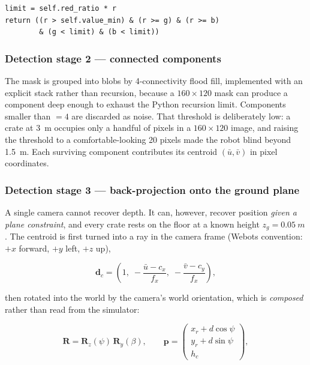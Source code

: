 \begin{lstlisting}[style=python]
limit = self.red_ratio * r
return ((r > self.value_min) & (r >= g) & (r >= b)
        & (g < limit) & (b < limit))
\end{lstlisting}

\subsubsection{Detection stage 2 --- connected components}

The mask is grouped into blobs by 4-connectivity flood fill, implemented
with an explicit stack rather than recursion, because a $160 \times 120$
mask can produce a component deep enough to exhaust the Python recursion
limit. Components smaller than  $= 4$ are
discarded as noise. That threshold is deliberately low: a crate at
\SI{3}{m} occupies only a handful of pixels in a $160 \times 120$ image,
and raising the threshold to a comfortable-looking 20 pixels made the
robot blind beyond \SI{1.5}{m}. Each surviving component contributes its
centroid $(\bar u, \bar v)$ in pixel coordinates.

\subsubsection{Detection stage 3 --- back-projection onto the ground plane}

A single camera cannot recover depth. It can, however, recover position
\emph{given a plane constraint}, and every crate rests on the floor at a
known height $z_g = \SI{0.05}{m}$. The centroid is first turned into a
ray in the camera frame (Webots convention: $+x$ forward, $+y$ left,
$+z$ up),

\begin{equation}
\mathbf{d}_c = \left(1,\; -\frac{\bar u - c_x}{f_x},\;
                         -\frac{\bar v - c_y}{f_x}\right),
\label{eq:ray}
\end{equation}

then rotated into the world by the camera's world orientation, which is
\emph{composed} rather than read from the simulator:

\begin{equation}
\mathbf{R} = \mathbf{R}_z(\psi)\,\mathbf{R}_y(\beta),
\qquad
\mathbf{p} = \begin{pmatrix}
  x_r + d\cos\psi\\[1pt] y_r + d\sin\psi\\[1pt] h_c
\end{pmatrix},
\label{eq:campose}
\end{equation}

